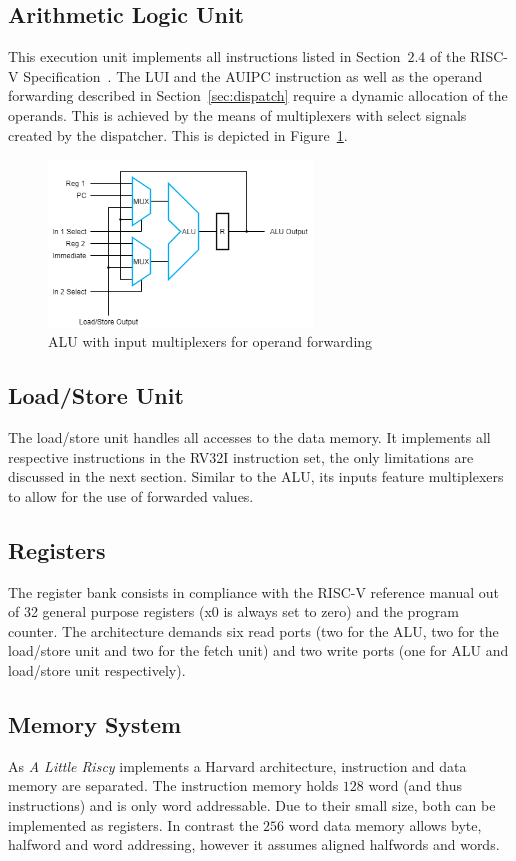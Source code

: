\documentclass[conference]{IEEEtran}
\begin{document}
\subsection{Arithmetic Logic Unit}
This execution unit implements all instructions listed in Section~$2.4$ of the RISC-V Specification~\cite{risc-v}. The LUI and the AUIPC instruction as well as the operand forwarding described in Section~\ref{sec:dispatch} require a dynamic allocation of the operands. This is achieved by the means of multiplexers with select signals created by the dispatcher. This is depicted in Figure~\ref{fig:alu}.

\begin{figure}
	\centering
	\includegraphics[width=7cm]{alu_mux.png}
	\caption{ALU with input multiplexers for operand forwarding}
	\label{fig:alu}
\end{figure}

\subsection{Load/Store Unit} \label{sec:load_store}
The load/store unit handles all accesses to the data memory. It implements all respective instructions in the RV32I instruction set, the only limitations are discussed in the next section. Similar to the ALU, its inputs feature multiplexers to allow for the use of forwarded values.

\subsection{Registers} \label{sec:registers}
The register bank consists in compliance with the RISC-V reference manual out of 32 general purpose registers (x0 is always set to zero) and the program counter. The architecture demands six read ports (two for the ALU, two for the load/store unit and two for the fetch unit) and two write ports (one for ALU and load/store unit respectively).

\subsection{Memory System} \label{sec:memory}
As \emph{A Little Riscy} implements a Harvard architecture, instruction and data memory are separated. The instruction memory holds $128$ word (and thus instructions) and is only word addressable. Due to their small size, both can be implemented as registers. In contrast the $256$ word data memory allows byte, halfword and word addressing, however it assumes aligned halfwords and words.
\end{document}
